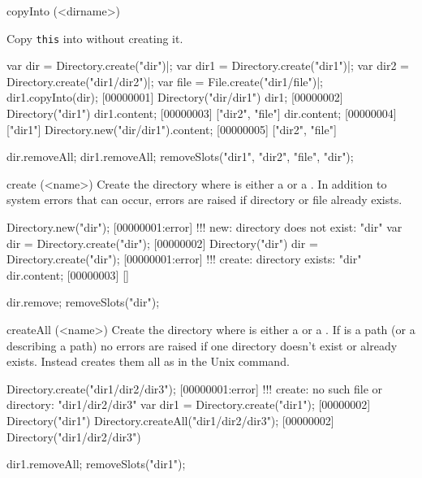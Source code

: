 \begin{urbiscriptapi}
\item[copyInto](<dirname>)
  \experimental{}

  Copy \lstinline|this| into  without creating it.
\begin{urbiscript}
var dir = Directory.create("dir")|;
var dir1 = Directory.create("dir1")|;
var dir2 = Directory.create("dir1/dir2")|;
var file = File.create("dir1/file")|;
dir1.copyInto(dir);
[00000001] Directory("dir/dir1")
dir1;
[00000002] Directory("dir1")
dir1.content;
[00000003] ["dir2", "file"]
dir.content;
[00000004] ["dir1"]
Directory.new("dir/dir1").content;
[00000005] ["dir2", "file"]
\end{urbiscript}
\begin{urbicomment}
dir.removeAll;
dir1.removeAll;
removeSlots("dir1", "dir2", "file", "dir");
\end{urbicomment}


\item[create](<name>)
  Create the directory  where  is either a
   or a . In addition to system errors that
  can occur, errors are raised if directory or file  already exists.
\begin{urbiscript}
Directory.new("dir");
[00000001:error] !!! new: directory does not exist: "dir"
var dir = Directory.create("dir");
[00000002] Directory("dir")
dir = Directory.create("dir");
[00000001:error] !!! create: directory exists: "dir"
dir.content;
[00000003] []
\end{urbiscript}
\begin{urbicomment}
dir.remove;
removeSlots("dir");
\end{urbicomment}


\item[createAll](<name>)
  Create the directory  where  is either a
   or a . If  is a
  path (or a  describing a path) no errors are
  raised if one directory doesn't exist or already exists. Instead
   creates them all as in the Unix  command.
\begin{urbiscript}
Directory.create("dir1/dir2/dir3");
[00000001:error] !!! create: no such file or directory: "dir1/dir2/dir3"
var dir1 = Directory.create("dir1");
[00000002] Directory("dir1")
Directory.createAll("dir1/dir2/dir3");
[00000002] Directory("dir1/dir2/dir3")
\end{urbiscript}
\begin{urbicomment}
dir1.removeAll;
removeSlots("dir1");
\end{urbicomment}



\end{urbiscriptapi}
